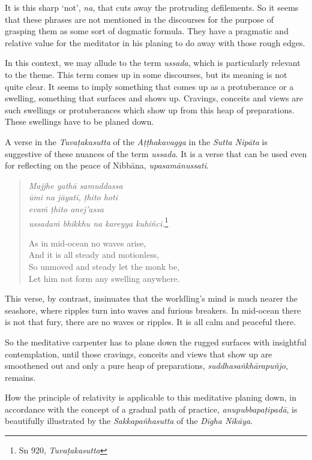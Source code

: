 It is this sharp `not', \emph{na}, that cuts away the protruding defilements. So it seems that these phrases are not mentioned in the discourses for the purpose of grasping them as some sort of dogmatic formula. They have a pragmatic and relative value for the meditator in his planing to do away with those rough edges.

In this context, we may allude to the term \emph{ussada}, which is particularly relevant to the theme. This term comes up in some discourses, but its meaning is not quite clear. It seems to imply something that comes up as a protuberance or a swelling, something that surfaces and shows up. Cravings, conceits and views are such swellings or protuberances which show up from this heap of preparations. These swellings have to be planed down.

A verse in the \emph{Tuvaṭakasutta} of the \emph{Aṭṭhakavagga} in the \emph{Sutta Nipāta} is suggestive of these nuances of the term \emph{ussada}. It is a verse that can be used even for reflecting on the peace of Nibbāna, \emph{upasamānussati}.

\begin{quote}
\emph{Majjhe yathā samuddassa}\\
\emph{ūmi na jāyatī, ṭhito hoti}\\
\emph{evaṁ ṭhito anej'assa}\\
\emph{ussadaṁ bhikkhu na kareyya kuhiñci.}\footnote{Sn 920, \emph{Tuvaṭakasutta}}

As in mid-ocean no waves arise,\\
And it is all steady and motionless,\\
So unmoved and steady let the monk be,\\
Let him not form any swelling anywhere.
\end{quote}

This verse, by contrast, insinuates that the worldling's mind is much nearer the seashore, where ripples turn into waves and furious breakers. In mid-ocean there is not that fury, there are no waves or ripples. It is all calm and peaceful there.

So the meditative carpenter has to plane down the rugged surfaces with insightful contemplation, until those cravings, conceits and views that show up are smoothened out and only a pure heap of preparations, \emph{suddhasaṅkhārapuñjo}, remains.

\enlargethispage{\baselineskip}

How the principle of relativity is applicable to this meditative planing down, in accordance with the concept of a gradual path of practice, \emph{anupubbapaṭipadā}, is beautifully illustrated by the \emph{Sakkapañhasutta} of the \emph{Dīgha Nikāya}.

